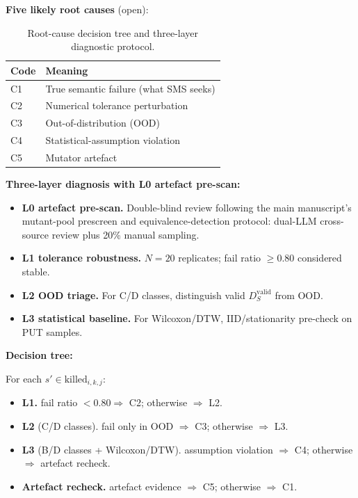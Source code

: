 \documentclass[manuscript,screen,review]{acmart}
\begin{document}
\textbf{Five likely root causes} (open):

{%
\begin{longtable}[]{@{}ll@{}}
\caption{Root-cause decision tree and three-layer diagnostic protocol.}\label{tab:p2-15}\\
\toprule\noalign{}
Code & Meaning \\
\midrule\noalign{}
\endfirsthead
\endhead
\bottomrule\noalign{}
\endlastfoot
C1 & True semantic failure (what SMS seeks) \\
C2 & Numerical tolerance perturbation \\
C3 & Out-of-distribution (OOD) \\
C4 & Statistical-assumption violation \\
C5 & Mutator artefact \\
\end{longtable}
}

\textbf{Three-layer diagnosis with L0 artefact pre-scan:}

\begin{itemize}
\item \textbf{L0 artefact pre-scan.} Double-blind review following the main manuscript's mutant-pool prescreen and equivalence-detection protocol: dual-LLM cross-source review plus 20\% manual sampling.
\item \textbf{L1 tolerance robustness.} $N = 20$ replicates; fail ratio $\geq 0.80$ considered stable.
\item \textbf{L2 OOD triage.} For C/D classes, distinguish valid $D_S^{\text{valid}}$ from OOD.
\item \textbf{L3 statistical baseline.} For Wilcoxon/DTW, IID/stationarity pre-check on PUT samples.
\end{itemize}

\textbf{Decision tree:}

For each $s' \in \mathrm{killed}_{i,k,j}$:
\begin{itemize}
\item \textbf{L1.} fail ratio $< 0.80 \Rightarrow$ C2; otherwise $\Rightarrow$ L2.
\item \textbf{L2} (C/D classes). fail only in OOD $\Rightarrow$ C3; otherwise $\Rightarrow$ L3.
\item \textbf{L3} (B/D classes + Wilcoxon/DTW). assumption violation $\Rightarrow$ C4; otherwise $\Rightarrow$ artefact recheck.
\item \textbf{Artefact recheck.} artefact evidence $\Rightarrow$ C5; otherwise $\Rightarrow$ C1.
\end{itemize}
\end{document}
